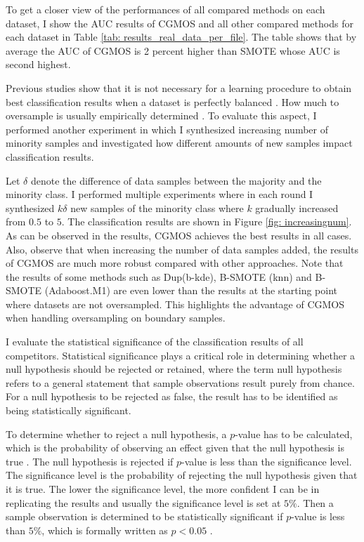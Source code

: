 \documentclass{iitthesis}
\begin{document}
To get a closer view of the performances of all compared methods on each dataset, I show the AUC results of CGMOS and all other compared methods for each dataset in Table \ref{tab: results_real_data_per_file}. The table shows that by average the AUC of CGMOS is 2 percent higher than SMOTE whose AUC is second highest. 

Previous studies show that it is not necessary for a learning procedure to obtain best classification results when a dataset is perfectly balanced \cite{batista2004study}\cite{weiss2003learning}. How much to oversample is usually empirically determined \cite{chawla2004editorial}. To evaluate this aspect, I performed another experiment in which I synthesized increasing number of minority samples and investigated how different amounts of new samples impact classification results.

Let $\delta$ denote the difference of data samples between the majority and the minority class. I performed multiple experiments where in each round I synthesized $k\delta$ new samples of the minority class where $k$ gradually increased from $0.5$ to $5$. The classification results are shown in Figure \ref{fig: increasingnum}. As can be observed in the results, CGMOS achieves the best results in all cases. Also, observe that when increasing the number of data samples added, the results of CGMOS are much more robust compared with other approaches. Note that the results of some methods such as Dup(b-kde), B-SMOTE (knn) and B-SMOTE (Adaboost.M1) are even lower than the results at the starting point where datasets are not oversampled. This highlights the advantage of CGMOS when handling oversampling on boundary samples. 

 I evaluate the statistical significance of the classification results of all competitors. Statistical significance plays a critical role in determining whether a null hypothesis should be rejected or retained, where the term null hypothesis refers to a general statement that sample observations result purely from chance. For a null hypothesis to be rejected as false, the result has to be identified as being statistically significant.

To determine whether to reject a null hypothesis, a $p$-value has to be calculated, which is the probability of observing an effect given that the null hypothesis is true \cite{JLD:11}. The null hypothesis is rejected if $p$-value is less than the significance level. The significance level is the probability of rejecting the null hypothesis given that it is true. The lower the significance level, the more confident I can be in replicating the results and usually the significance level is set at $5\%$. Then a sample observation is determined to be statistically significant if $p$-value is less than $5\%$, which is formally written as $p<0.05$ \cite{SM:06}.
\end{document}
